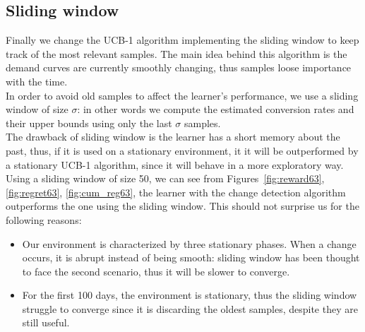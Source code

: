 \subsection{Sliding window}
Finally we change the UCB-1 algorithm implementing the sliding window to keep track of the most relevant samples.
The main idea behind this algorithm is the demand curves are currently smoothly changing, thus samples loose importance with the time.\\
In order to avoid old samples to affect the learner's performance, we use a sliding window of size $\sigma$: in other words we compute the estimated conversion rates and their upper bounds using only the last $\sigma$ samples.\\
The drawback of sliding window is the learner has a short memory about the past, thus, if it is used on a stationary environment, it it will be outperformed by a stationary UCB-1 algorithm, since it will behave in a more exploratory way.
Using a sliding window of size 50, we can see from Figures~\ref{fig:reward63}, \ref{fig:regret63}, \ref{fig:cum_reg63}, the learner with the change detection algorithm outperforms
the one using the sliding window. This should not surprise us for the following reasons:
\begin{itemize}
    \item Our environment is characterized by three stationary phases. When a change occurs, it is abrupt instead of being smooth: sliding window has been thought to face the second scenario, thus it will be slower to converge.
    \item For the first 100 days, the environment is stationary, thus the sliding window struggle to converge since it is discarding the oldest samples, despite they are still useful.
\end{itemize}




